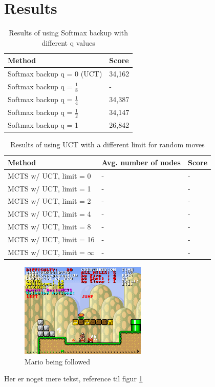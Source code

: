 \documentclass[10pt,a4paper]{article}
\begin{document}
\section{Results}
\renewcommand{\arraystretch}{1.5}
\begin{table}[h]
	\centering
	\begin{tabular}{| l | l |}
		\hline
		\textbf{Method} & \textbf{Score} \\ \hline
		Softmax backup q = 0 (UCT) & 34,162 \\ \hline
		Softmax backup q = $\frac{1}{8}$ & - \\ \hline
		Softmax backup q = $\frac{1}{4}$ & 34,387 \\ \hline
		Softmax backup q = $\frac{1}{2}$ & 34,147 \\ \hline
		Softmax backup q = 1 & 26,842 \\ \hline
	\end{tabular}
	\caption{Results of using Softmax backup with different q values}
	\label{tab:softmax_results}
\end{table}
\begin{table}[h]
	\centering
	\begin{tabular}{| l | l | l |}
		\hline
		\textbf{Method} & \textbf{Avg. number of nodes} & \textbf{Score} \\ \hline
		MCTS w/ UCT, limit = 0			& - & - \\ \hline
		MCTS w/ UCT, limit = 1			& - & - \\ \hline
		MCTS w/ UCT, limit = 2			& - & - \\ \hline
		MCTS w/ UCT, limit = 4			& - & - \\ \hline
		MCTS w/ UCT, limit = 8			& - & - \\ \hline
		MCTS w/ UCT, limit = 16			& - & - \\ \hline
		MCTS w/ UCT, limit = $\infty$	& - & - \\ \hline
	\end{tabular}
	\caption{Results of using UCT with a different limit for random moves}
	\label{tab:uct_results}
\end{table}
\begin{figure}[h]
\centering
\includegraphics[width=6cm]{Forfulgt.png}
\caption{Mario being followed}
\label{fig:followed}
\end{figure}
Her er noget mere tekst, reference til figur \ref{fig:followed}
\clearpage
\end{document}
